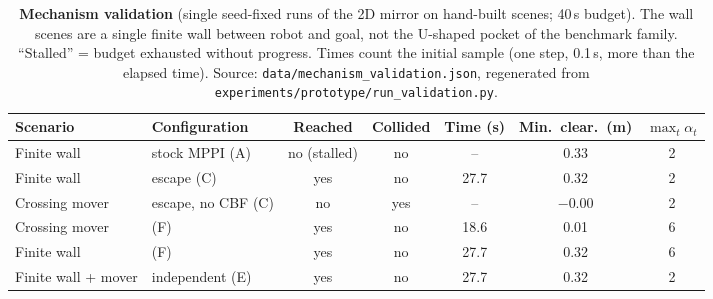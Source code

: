 \begin{table}[t]
\centering
\caption{\textbf{Mechanism validation} (single seed-fixed runs of the 2D mirror on hand-built scenes; 40\,s budget). The wall scenes are a single finite wall between robot and goal, not the U-shaped pocket of the benchmark family. ``Stalled'' = budget exhausted without progress. Times count the initial sample (one step, 0.1\,s, more than the elapsed time). Source: \texttt{data/mechanism\_validation.json}, regenerated from \texttt{experiments/prototype/run\_validation.py}.}
\label{tab:mechanism}
\small
\begin{tabular}{llccccc}
\toprule
Scenario & Configuration & Reached & Collided & Time (s) & Min.\ clear.\ (m) & $\max_t\alpha_t$ \\
\midrule
Finite wall & stock MPPI (A) & no (stalled) & no & -- & 0.33 & 2 \\
Finite wall & escape (C) & yes & no & 27.7 & 0.32 & 2 \\
Crossing mover & escape, no CBF (C) & no & yes & -- & $-$0.00 & 2 \\
Crossing mover & \sname{} (F) & yes & no & 18.6 & 0.01 & 6 \\
Finite wall & \sname{} (F) & yes & no & 27.7 & 0.32 & 6 \\
Finite wall + mover & independent (E) & yes & no & 27.7 & 0.32 & 2 \\
\bottomrule
\end{tabular}
\end{table}
